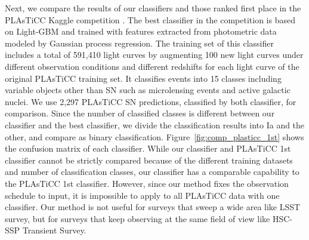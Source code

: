 \documentclass[useamsfonts]{pasj01}
\begin{document}
Next, we compare the results of our classifiers and those ranked first place in the PLAsTiCC Kaggle competition \citep{malz19a}.
The best classifier in the competition \citep{boone19a} is based on Light-GBM and trained with features extracted from photometric data modeled by Gaussian process regression.
The training set of this classifier includes a total of 591,410 light curves by augmenting 100 new light curves under different observation conditions and different redshifts for each light curve of the original PLAsTiCC training set.
It classifies events into 15 classes including variable objects other than SN such as microlensing events and active galactic nuclei.
We use 2,297 PLAsTiCC SN predictions, classified by both classifier, for comparison.
Since the number of classified classes is different between our classifier and the best classifier, we divide the classification results into Ia and the other, and compare as binary classification.
Figure\ \ref{fig:comp_plasticc_1st} shows the confusion matrix of each classifier.
While our classifier and PLAsTiCC 1st classifier cannot be strictly compared because of the different training datasets and number of classification classes,
our classifier has a comparable capability to the PLAsTiCC 1st classifier.
However, since our method fixes the observation schedule to input, it is impossible to apply to all PLAsTiCC data with one classifier.
Our method is not useful for surveys that sweep a wide area like LSST survey, but for surveys that keep observing at the same field of view like HSC-SSP Transient Survey.
%
\end{document}
